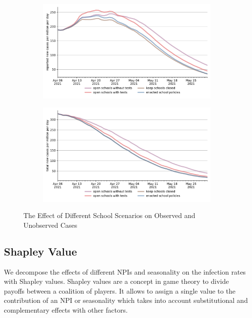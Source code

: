 \begin{figure}[ht]
  \centering
  \begin{subfigure}{.6\textwidth}
    \includegraphics[width=0.9 \textwidth]{figures/results/figures/scenario_comparisons/school_scenarios/full_new_known_case}
  \end{subfigure}%
  \begin{subfigure}{.6\textwidth}
    \includegraphics[width=0.9 \textwidth]{figures/results/figures/scenario_comparisons/school_scenarios/full_newly_infected}
  \end{subfigure}
  \caption{The Effect of Different School Scenarios on Observed and Unobserved Cases}
  \label{fig:school_scenarios_detailed}
\end{figure}


\FloatBarrier



\FloatBarrier


\subsection{Shapley Value} %
\label{sub:shapley_value}

We decompose the effects of different NPIs and seasonality on the infection rates with
Shapley values. Shapley values \citep{Shapley2016} are a concept in game theory to
divide payoffs between a coalition of players. It allows to assign a single value to the
contribution of an NPI or seasonality which takes into account substitutional and
complementary effects with other factors.

